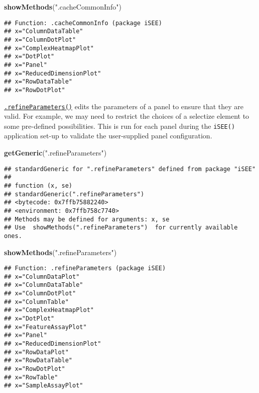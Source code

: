 \documentclass[
]{book}
\newenvironment{Shaded}{\begin{snugshade}}{\end{snugshade}}
\newcommand{\KeywordTok}[1]{\textcolor[rgb]{0.13,0.29,0.53}{\textbf{#1}}}
\newcommand{\NormalTok}[1]{#1}
\newcommand{\StringTok}[1]{\textcolor[rgb]{0.31,0.60,0.02}{#1}}
\begin{document}
\begin{Shaded}
\begin{Highlighting}[]
\KeywordTok{showMethods}\NormalTok{(}\StringTok{".cacheCommonInfo"}\NormalTok{)}
\end{Highlighting}
\end{Shaded}

\begin{verbatim}
## Function: .cacheCommonInfo (package iSEE)
## x="ColumnDataTable"
## x="ColumnDotPlot"
## x="ComplexHeatmapPlot"
## x="DotPlot"
## x="Panel"
## x="ReducedDimensionPlot"
## x="RowDataTable"
## x="RowDotPlot"
\end{verbatim}

\href{https://isee.github.io/iSEE/reference/setup-generics.html}{\texttt{.refineParameters()}} edits the parameters of a panel to ensure that they are valid.
For example, we may need to restrict the choices of a selectize element to some pre-defined possibilities.
This is run for each panel during the \texttt{iSEE()} application set-up to validate the user-supplied panel configuration.

\begin{Shaded}
\begin{Highlighting}[]
\KeywordTok{getGeneric}\NormalTok{(}\StringTok{".refineParameters"}\NormalTok{)}
\end{Highlighting}
\end{Shaded}

\begin{verbatim}
## standardGeneric for ".refineParameters" defined from package "iSEE"
## 
## function (x, se) 
## standardGeneric(".refineParameters")
## <bytecode: 0x7ffb75882240>
## <environment: 0x7ffb758c7740>
## Methods may be defined for arguments: x, se
## Use  showMethods(".refineParameters")  for currently available ones.
\end{verbatim}

\begin{Shaded}
\begin{Highlighting}[]
\KeywordTok{showMethods}\NormalTok{(}\StringTok{".refineParameters"}\NormalTok{)}
\end{Highlighting}
\end{Shaded}

\begin{verbatim}
## Function: .refineParameters (package iSEE)
## x="ColumnDataPlot"
## x="ColumnDataTable"
## x="ColumnDotPlot"
## x="ColumnTable"
## x="ComplexHeatmapPlot"
## x="DotPlot"
## x="FeatureAssayPlot"
## x="Panel"
## x="ReducedDimensionPlot"
## x="RowDataPlot"
## x="RowDataTable"
## x="RowDotPlot"
## x="RowTable"
## x="SampleAssayPlot"
\end{verbatim}
\end{document}
